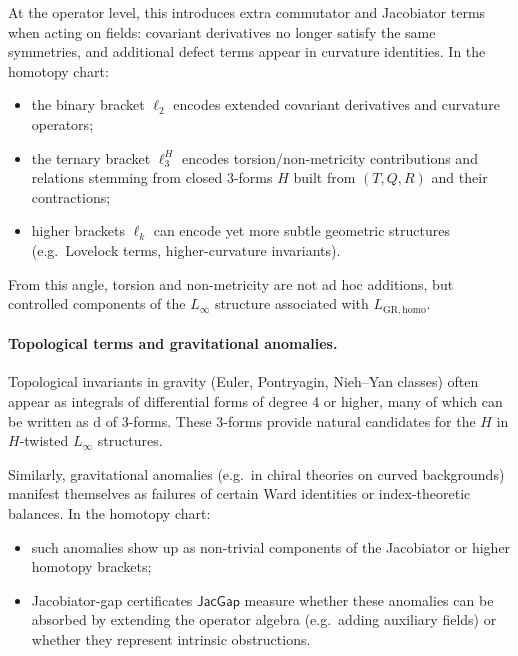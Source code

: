 \documentclass[11pt]{book}
\theoremstyle{plain}
\theoremstyle{definition}
\begin{document}
At the operator level, this introduces extra commutator and Jacobiator
terms when acting on fields: covariant derivatives no longer satisfy
the same symmetries, and additional defect terms appear in curvature
identities. In the homotopy chart:

\begin{itemize}
  \item the binary bracket $\ell_2$ encodes extended covariant
        derivatives and curvature operators;
  \item the ternary bracket $\ell_3^H$ encodes torsion/non-metricity
        contributions and relations stemming from closed 3-forms $H$
        built from $(T,Q,R)$ and their contractions;
  \item higher brackets $\ell_k$ can encode yet more subtle geometric
        structures (e.g.\ Lovelock terms, higher-curvature invariants).
\end{itemize}

From this angle, torsion and non-metricity are not ad hoc additions,
but controlled components of the $L_\infty$ structure associated with
$L_{\mathrm{GR,homo}}$.

\paragraph{Topological terms and gravitational anomalies.}

Topological invariants in gravity (Euler, Pontryagin, Nieh--Yan
classes) often appear as integrals of differential forms of degree
4 or higher, many of which can be written as $\mathrm{d}$ of 3-forms.
These 3-forms provide natural candidates for the $H$ in $H$-twisted
$L_\infty$ structures.

Similarly, gravitational anomalies (e.g.\ in chiral theories on curved
backgrounds) manifest themselves as failures of certain Ward
identities or index-theoretic balances. In the homotopy chart:

\begin{itemize}
  \item such anomalies show up as non-trivial components of the
        Jacobiator or higher homotopy brackets;
  \item Jacobiator-gap certificates $\mathsf{JacGap}$ measure whether
        these anomalies can be absorbed by extending the operator
        algebra (e.g.\ adding auxiliary fields) or whether they
        represent intrinsic obstructions.
\end{itemize}
\end{document}
